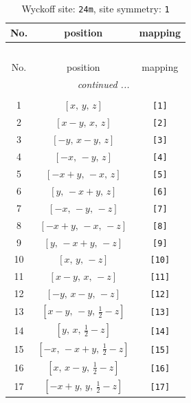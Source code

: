 \documentclass[fleqn,8pt]{jsarticle}
\begin{document}
\begin{longtable}{ccc}
\caption{Wyckoff site: {\tt 24m}, site symmetry: {\tt 1}}
 \\
 \hline \hline
No. & position & mapping \\ \hline \endfirsthead

\multicolumn{2}{l}{\tablename\ \thetable{}} \\
 \hline \hline
No. & position & mapping \\ \hline \endhead

 \hline \hline
\multicolumn{2}{r}{\footnotesize\it continued ...} \\ \endfoot

 \hline \hline
\multicolumn{2}{r}{} \\ \endlastfoot

1 & $\left[ x,\, y,\, z \right]$ & {\tt [1]} \\ \hline
2 & $\left[ x - y,\, x,\, z \right]$ & {\tt [2]} \\ \hline
3 & $\left[ - y,\, x - y,\, z \right]$ & {\tt [3]} \\ \hline
4 & $\left[ - x,\, - y,\, z \right]$ & {\tt [4]} \\ \hline
5 & $\left[ - x + y,\, - x,\, z \right]$ & {\tt [5]} \\ \hline
6 & $\left[ y,\, - x + y,\, z \right]$ & {\tt [6]} \\ \hline
7 & $\left[ - x,\, - y,\, - z \right]$ & {\tt [7]} \\ \hline
8 & $\left[ - x + y,\, - x,\, - z \right]$ & {\tt [8]} \\ \hline
9 & $\left[ y,\, - x + y,\, - z \right]$ & {\tt [9]} \\ \hline
10 & $\left[ x,\, y,\, - z \right]$ & {\tt [10]} \\ \hline
11 & $\left[ x - y,\, x,\, - z \right]$ & {\tt [11]} \\ \hline
12 & $\left[ - y,\, x - y,\, - z \right]$ & {\tt [12]} \\ \hline
13 & $\left[ x - y,\, - y,\, \frac{1}{2} - z \right]$ & {\tt [13]} \\ \hline
14 & $\left[ y,\, x,\, \frac{1}{2} - z \right]$ & {\tt [14]} \\ \hline
15 & $\left[ - x,\, - x + y,\, \frac{1}{2} - z \right]$ & {\tt [15]} \\ \hline
16 & $\left[ x,\, x - y,\, \frac{1}{2} - z \right]$ & {\tt [16]} \\ \hline
17 & $\left[ - x + y,\, y,\, \frac{1}{2} - z \right]$ & {\tt [17]} \\ \hline

\end{longtable}
\end{document}
